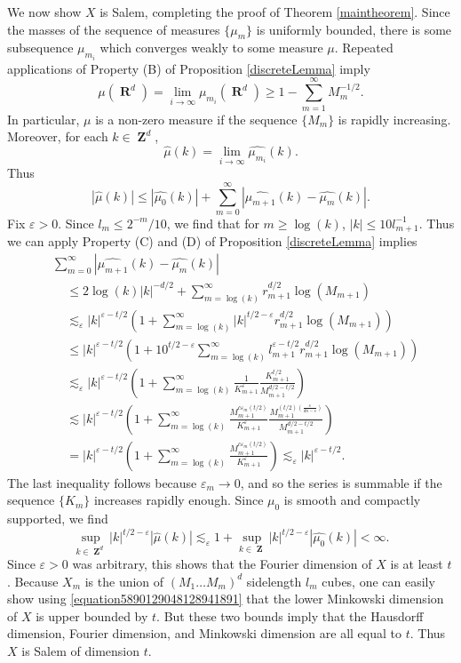 \documentclass[12pt,reqno]{article}
\numberwithin{equation}{section}
\DeclareMathOperator{\RR}{\mathbf{R}}
\DeclareMathOperator{\ZZ}{\mathbf{Z}}
\begin{document}
We now show $X$ is Salem, completing the proof of Theorem \ref{maintheorem}. Since the masses of the sequence of measures $\{ \mu_m \}$ is uniformly bounded, there is some subsequence $\mu_{m_i}$ which converges weakly to some measure $\mu$. Repeated applications of Property (B) of Proposition \ref{discreteLemma} imply
%
\[ \mu(\RR^d) = \lim_{i \to \infty} \mu_{m_i}(\RR^d) \geq 1 - \sum_{m=1}^\infty M_m^{-1/2}. \]
%
In particular, $\mu$ is a non-zero measure if the sequence $\{ M_m \}$ is rapidly increasing. Moreover, for each $k \in \ZZ^d$,
%
\[ \widehat{\mu}(k) = \lim_{i \to \infty} \widehat{\mu_{m_i}}(k). \]
%
Thus
%
\[ |\widehat{\mu}(k)| \leq |\widehat{\mu_0}(k)| + \sum_{m = 0}^\infty |\widehat{\mu_{m+1}}(k) - \widehat{\mu_m}(k)|. \]
%
Fix $\varepsilon > 0$. Since $l_m \leq 2^{-m}/10$, we find that for $m \geq \log(k)$, $|k| \leq 10 l_{m+1}^{-1}$. Thus we can apply Property (C) and (D) of Proposition \ref{discreteLemma} implies
%
\begin{align*}
    &\sum_{m = 0}^\infty |\widehat{\mu_{m+1}}(k) - \widehat{\mu_m}(k)|\\
    &\ \ \ \ \ \leq 2 \log(k) |k|^{-d/2} + \sum_{m = \log(k)}^\infty r_{m+1}^{d/2} \log(M_{m+1})\\
    &\ \ \ \ \ \lesssim_\varepsilon |k|^{\varepsilon- t/2} \left( 1 + \sum_{m = \log(k)}^\infty |k|^{t/2-\varepsilon} r_{m+1}^{d/2} \log(M_{m+1}) \right)\\
    &\ \ \ \ \ \leq |k|^{\varepsilon - t/2} \left( 1 + 10^{t/2 - \varepsilon} \sum_{m = \log(k)}^\infty l_{m+1}^{\varepsilon - t/2} r_{m+1}^{d/2} \log(M_{m+1}) \right)\\
    &\ \ \ \ \ \lesssim_\varepsilon |k|^{\varepsilon - t/2} \left( 1 + \sum_{m = \log(k)}^\infty \frac{1}{K_{m+1}^{\varepsilon}} \frac{K_{m+1}^{t/2}}{M_{m+1}^{d/2 - t/2}} \right)\\
    &\ \ \ \ \ \lesssim |k|^{\varepsilon - t/2} \left( 1 + \sum_{m = \log(k)}^\infty \frac{M_{m+1}^{c\varepsilon_m (t/2)}}{K_{m+1}^\varepsilon} \frac{M_{m+1}^{(t/2) \left( \frac{s}{dn-s} \right)}}{M_{m+1}^{d/2 - t/2}} \right)\\
    &\ \ \ \ \ = |k|^{\varepsilon - t/2} \left( 1 + \sum_{m = \log(k)}^\infty \frac{M_{m+1}^{c\varepsilon_m (t/2)}}{K_{m+1}^{\varepsilon}} \right) \lesssim_\varepsilon |k|^{\varepsilon - t/2}.
\end{align*}
%
The last inequality follows because $\varepsilon_m \to 0$, and so the series is summable if the sequence $\{ K_m \}$ increases rapidly enough. Since $\mu_0$ is smooth and compactly supported, we find
%
\[ \sup_{k \in \ZZ^d} |k|^{t/2 - \varepsilon} |\widehat{\mu}(k)| \lesssim_\varepsilon 1 + \sup_{k \in \ZZ} |k|^{t/2 - \varepsilon} |\widehat{\mu_0}(k)| < \infty. \]
%
Since $\varepsilon > 0$ was arbitrary, this shows that the Fourier dimension of $X$ is at least $t$. Because $X_m$ is the union of $(M_1 \dots M_m)^d$ sidelength $l_m$ cubes, one can easily show using \eqref{equation5890129048128941891} that the lower Minkowski dimension of $X$ is upper bounded by $t$. But these two bounds imply that the Hausdorff dimension, Fourier dimension, and Minkowski dimension are all equal to $t$. Thus $X$ is Salem of dimension $t$.
\end{document}
